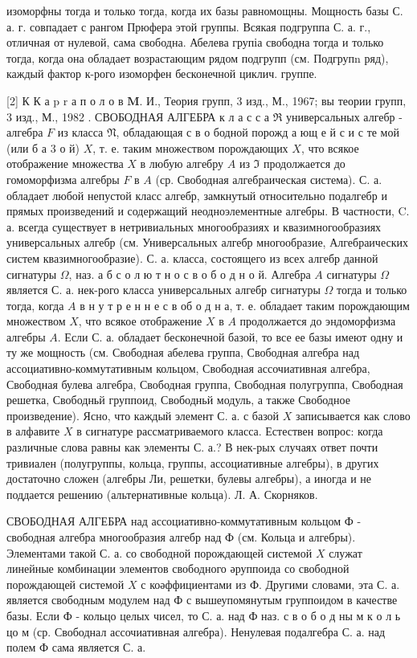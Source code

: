 \documentclass[10pt]{article}
\begin{document}
изоморфны тогда и только тогда, когда их базы равномощны. Мощность базы С. а. г. совпадает с рангом Прюфера этой группы. Всякая подгруппа С. а. г., отличная от нулевой, сама свободна. Абелева групіа свободна тогда и только тогда, когда она обладает возрастающим рядом подгрупп (см. Подгрупn ряд), каждый фактор к-рого изоморфен бесконечной циклич. группе.



[2] К К а p r а п о л о в $\mathbf{M}$. И., Теория групп, 3 изд., М., 1967; вы теории групп, 3 изд., М., 1982 . СВОБОДНАЯ АЛГЕБРА к л а с с а $\Re$ универсальных алгебр - алгебра $F$ из класса $\mathfrak{N}$, обладающая с в о бодной порожд а ющ е й с и с те мой (или б а 3 о й) $X$, т. е. таким множеством порождающих $X$, что всякое отображение множества $X$ в любую алгебру $A$ из $\mathfrak{I}$ продолжается до гомоморфизма алгебры $F$ в $A$ (ср. Свободная алгебраическая система). С. а. обладает любой непустой класс алгебр, замкнутый относительно подалгебр и прямых произведений и содержащий неодноэлементные алгебры. В частности, C. а. всегда существует в нетривиальных многообразиях и квазимногообразиях универсальных алгебр (см. Универсальных алгебр многообразие, Алгебраических систем квазимногообразие). С. а. класса, состоящего из всех алгебр данной сигнатуры $\Omega$, наз. а б с о л ю т н о с в о б о д н о й. Алгебра $A$ сигнатуры $\Omega$ является С. а. нек-рого класса универсальных алгебр сигнатуры $\Omega$ тогда и только тогда, когда $A$ в н у т р е н н е с в об о д н а, т. е. обладает таким порождающим множеством $X$, что всякое отображение $X$ в $A$ продолжается до эндоморфизма алгебры $A$. Если С. а. обладает бесконечной базой, то все ее базы имеют одну и ту же мощность (см. Свободная абелева группа, Свободная алгебра над ассоциативно-коммутативным кольцом, Свободная ассочиативная алгебра, Свободная булева алгебра, Свободная группа, Свободная полугруппа, Свободная решетка, Свободньй группоид, Свободньй модуль, а также Свободное произведение). Ясно, что каждый элемент С. а. с базой $X$ записывается как слово в алфавите $X$ в сигнатуре рассматриваемого класса. Естествен вопрос: когда различные слова равны как элементы С. а.? В нек-рых случаях ответ почти тривиален (полугруппы, кольца, группы, ассоциативные алгебры), в других достаточно сложен (алгебры Ли, решетки, булевы алгебры), а иногда и не поддается решению (альтернативные кольца). Л. А. Скорняков.



СВОБОДНАЯ АЛГЕБРА над ассоциативно-коммутативным кольцом Ф - свободная алгебра многообразия алгебр над Ф (см. Кольца и алгебры). Элементами такой С. а. со свободной порождающей системой $X$ служат линейные комбинации элементов свободного әруппоида со свободной порождающей системой $X$ с коәффициентами из Ф. Другими словами, эта С. а. является свободным модулем над Ф с вышеупомянутым группоидом в качестве базы. Если Ф - кольцо целых чисел, то С. а. над Ф наз. с в о б о д ны м к о л ь цо м (ср. Свободнал ассочиативная алгебра). Ненулевая подалгебра С. а. над полем Ф сама является С. а.
\end{document}
